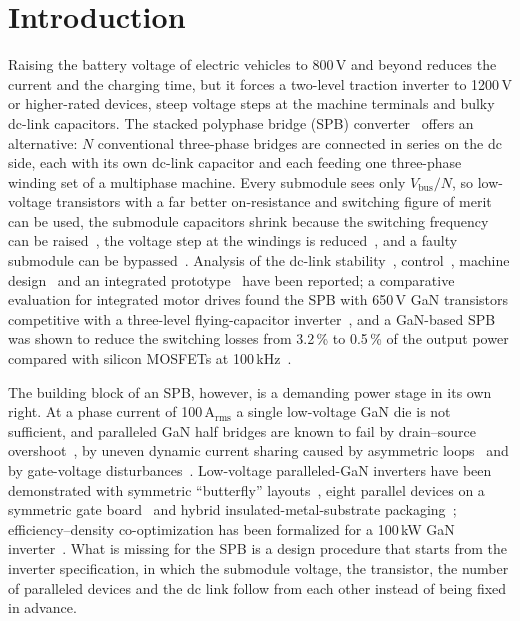 \documentclass[conference]{IEEEtran}
\begin{document}
\section{Introduction}
Raising the battery voltage of electric vehicles to 800\,V and beyond reduces the current and the charging time, but it forces a two-level traction inverter to 1200\,V or higher-rated devices, steep voltage steps at the machine terminals and bulky dc-link capacitors. The stacked polyphase bridge (SPB) converter~\cite{norrga2013,jin2014} offers an alternative: $N$ conventional three-phase bridges are connected in series on the dc side, each with its own dc-link capacitor and each feeding one three-phase winding set of a multiphase machine. Every submodule sees only $V_\mathrm{bus}/N$, so low-voltage transistors with a far better on-resistance and switching figure of merit can be used, the submodule capacitors shrink because the switching frequency can be raised~\cite{jin2017}, the voltage step at the windings is reduced~\cite{bringezu2023}, and a faulty submodule can be bypassed~\cite{jin2017}. Analysis of the dc-link stability~\cite{nikouie2017tpel}, control~\cite{jin2014,bringezu2023,verkroost2024}, machine design~\cite{zhang2014,bringezu2020} and an integrated prototype~\cite{nikouie2017} have been reported; a comparative evaluation for integrated motor drives found the SPB with 650\,V GaN transistors competitive with a three-level flying-capacitor inverter~\cite{rohner2024}, and a GaN-based SPB was shown to reduce the switching losses from 3.2\,\% to 0.5\,\% of the output power compared with silicon MOSFETs at 100\,kHz~\cite{jin2016}.

The building block of an SPB, however, is a demanding power stage in its own right. At a phase current of 100\,A$_\mathrm{rms}$ a single low-voltage GaN die is not sufficient, and paralleled GaN half bridges are known to fail by drain--source overshoot~\cite{brothers2019}, by uneven dynamic current sharing caused by asymmetric loops~\cite{lu2017,tran2025} and by gate-voltage disturbances~\cite{tran2025,musumeci2022}. Low-voltage paralleled-GaN inverters have been demonstrated with symmetric ``butterfly'' layouts~\cite{wattenberg2023}, eight parallel devices on a symmetric gate board~\cite{cooke2026} and hybrid insulated-metal-substrate packaging~\cite{tran2025}; efficiency--density co-optimization has been formalized for a 100\,kW GaN inverter~\cite{zou2025}. What is missing for the SPB is a design procedure that starts from the inverter specification, in which the submodule voltage, the transistor, the number of paralleled devices and the dc link follow from each other instead of being fixed in advance.
\end{document}
